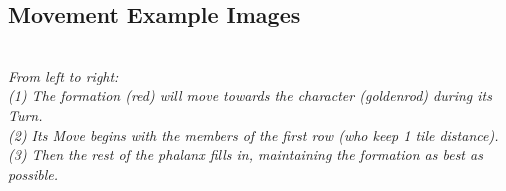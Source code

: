 \subsection*{Movement Example Images}
\begin{center}
\\
\emph{From left to right:\\
(1) The formation (red) will move towards the character (goldenrod) during its Turn.\\
(2) Its Move begins with the members of the first row (who keep 1 tile distance).\\
(3) Then the rest of the phalanx fills in, maintaining the formation as best as possible.}\\
\ \\

\end{center}
